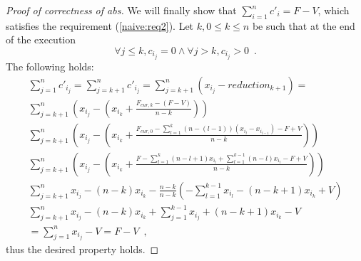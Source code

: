 \begin{proof}[Proof of correctness of abs]
  We will finally show that $\sum\limits_{i=1}^nc'_i = F - V$, which satisfies the requirement (\ref{naive:req2}).
  Let $k, 0 \leq k \leq n$ be such that at the end of the execution
  \begin{equation*}
    \forall j \leq k, c_{i_j} = 0 \wedge \forall j > k, c_{i_j} > 0 \enspace.
  \end{equation*}
  The following holds:
  \begin{equation*}
  \begin{gathered}
    \sum\limits_{j=1}^nc'_{i_j} = \sum\limits_{j=k+1}^nc'_{i_j} = \sum\limits_{j=k+1}^n\left(x_{i_j} -
    reduction_{k+1}\right) = \\
    \sum\limits_{j=k+1}^n\left(x_{i_j} - \left(x_{i_k} + \frac{F_{cur, k} - \left(F - V\right)}{n - k}\right)\right) \\
    \sum\limits_{j=k+1}^n\left(x_{i_j} - \left(x_{i_k} + \frac{F_{cur, 0} - \sum\limits_{l=1}^k\left(n
    - \left(l - 1\right)\right)\left(x_{i_l} - x_{i_{l-1}}\right) - F + V}{n - k}\right)\right) \\
    \sum\limits_{j=k+1}^n\left(x_{i_j} - \left(x_{i_k} + \frac{F - \sum\limits_{l=1}^k\left(n - l + 1\right)x_{i_l} +
    \sum\limits_{l=1}^{k-1}\left(n - l\right)x_{i_l} - F + V}{n - k}\right)\right) \\
    \sum\limits_{j=k+1}^nx_{i_j} - \left(n - k\right)x_{i_k} - \frac{n - k}{n - k}\left(-\sum\limits_{l=1}^{k-1}x_{i_l} -
    \left(n - k + 1\right)x_{i_k} + V\right) \\
    \sum\limits_{j=k+1}^nx_{i_j} - \left(n - k\right)x_{i_k} + \sum\limits_{j=1}^{k-1}x_{i_j} +
    \left(n - k + 1\right)x_{i_k} - V \\
    = \sum\limits_{j=1}^nx_{i_j} - V = F - V \enspace,
  \end{gathered}
  \end{equation*}
  thus the desired property holds.
\end{proof}
